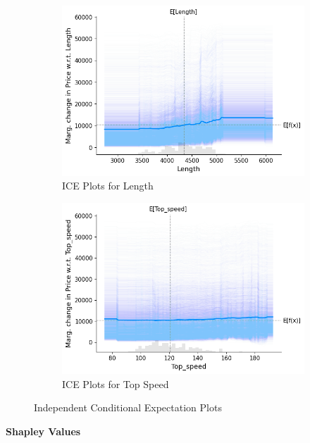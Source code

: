 \documentclass[12pt]{article}
\begin{document}
\begin{figure}[h]
\begin{subfigure}{0.32\textwidth}
    \includegraphics[width=\linewidth]{ice_length.png}
    \caption{ICE Plots for Length}
    \label{ice_length}
  \end{subfigure}
  \medskip
  \begin{subfigure}{0.32\textwidth}
    \includegraphics[width=\linewidth]{ice_topspeed.png}
    \caption{ICE Plots for Top Speed}
    \label{ice_topspeed}
  \end{subfigure}
  \caption{Independent Conditional Expectation Plots}
  \label{ice_plots}
\end{figure}
\FloatBarrier
\newpage
\noindent \textbf{Shapley Values} \\
\end{document}
